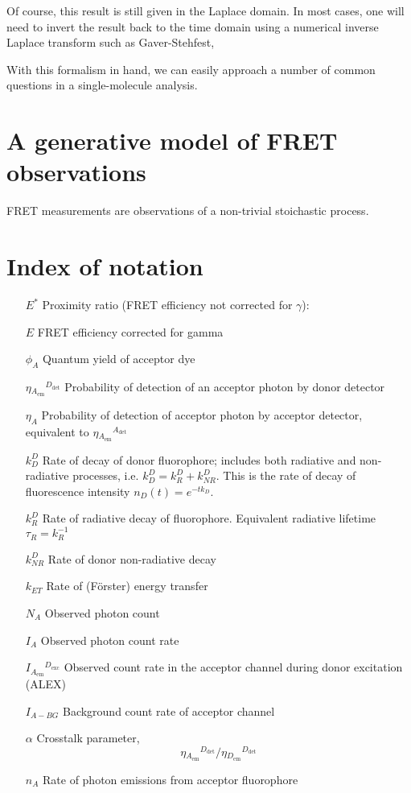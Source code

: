 \documentclass{article}
\newcommand{\emm}[1]{\ensuremath{_{#1_\mathrm{em}}}}   %
\newcommand{\exc}[1]{\ensuremath{^{#1_\mathrm{exc}}}}  %
\newcommand{\dt}[1]{\ensuremath{^{#1_\mathrm{det}}}}   %
\newcommand{\I}[2]{\ensuremath{I\emm{#1}\exc{#2}}}
\newcommand{\NR}{\ensuremath{\mathit{NR}}}          %
\newcommand{\ET}{\ensuremath{\mathit{ET}}}          %
\begin{document}
Of course, this result is still given in the Laplace domain. In most
cases, one will need to invert the result back to the time domain
using a numerical inverse Laplace transform such as Gaver-Stehfest,



With this formalism in hand, we can easily approach a number of common
questions in a single-molecule analysis.


\section{A generative model of FRET observations}

FRET measurements are observations of a non-trivial stoichastic process.

\section{Index of notation}

\begin{enumerate}
\item[$E^*$] Proximity ratio (FRET efficiency not corrected for $\gamma$):
\item[$E$] FRET efficiency corrected for gamma
\item[$\phi_{A}$] Quantum yield of acceptor dye
\item[$\eta\emm{A}\dt{D}$] Probability of detection of an acceptor photon by donor detector
\item[$\eta_A$] Probability of detection of acceptor photon by acceptor detector, equivalent to $\eta\emm{A}\dt{A}$
\item[$k^D_D$] Rate of decay of donor fluorophore; includes both radiative and non-radiative processes, i.e. $k^D_D = k^D_R + k^D_\NR$. This is the rate of decay of fluorescence intensity $n_D(t) = e^{-t k_D}$.
\item[$k^D_R$] Rate of radiative decay of fluorophore. Equivalent radiative lifetime $\tau_R = k_R^{-1}$
\item[$k^D_\NR$] Rate of donor non-radiative decay
\item[$k_\ET$] Rate of (F\"orster) energy transfer
\item[$N_A$] Observed photon count
\item[$I_A$] Observed photon count rate
\item[$\I{A}{D}$] Observed count rate in the acceptor channel during donor excitation (ALEX)
\item[$I_{A-BG}$] Background count rate of acceptor channel
\item[$\alpha$] Crosstalk parameter, \[ \eta\emm{A}\dt{D} / \eta\emm{D}\dt{D} \]
\item[$n_A$] Rate of photon emissions from acceptor fluorophore
\end{enumerate}
\end{document}

